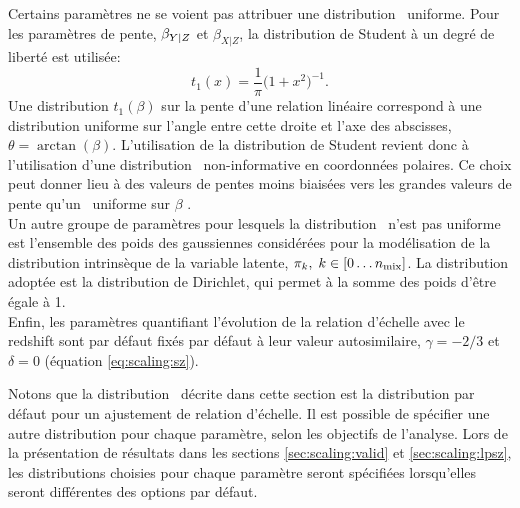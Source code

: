 Certains paramètres ne se voient pas attribuer une distribution \prior\ uniforme.
Pour les paramètres de pente, $\beta_{Y|Z}$ et $\beta_{X|Z}$, la distribution de Student à un degré de liberté est utilisée:
\begin{equation}
    t_1(x) = \frac{1}{\pi} \big(1 + x^2\big)^{-1}.
\end{equation}
Une distribution $t_1(\beta)$ sur la pente d'une relation linéaire correspond à une distribution uniforme sur l'angle entre cette droite et l'axe des abscisses, $\theta = \arctan(\beta)$.
L'utilisation de la distribution de Student revient donc à l'utilisation d'une distribution \prior\ non-informative en coordonnées polaires.
Ce choix peut donner lieu à des valeurs de pentes moins biaisées vers les grandes valeurs de pente qu'un \prior\ uniforme sur $\beta$ \cite{andreon_measurement_2013,sereno_bayesian_2016}. \\
Un autre groupe de paramètres pour lesquels la distribution \prior\ n'est pas uniforme est l'ensemble des poids des gaussiennes considérées pour la modélisation de la distribution intrinsèque de la variable latente, $\pi_k,\; k \in [0\dots n_{\rm mix}]$.
La distribution adoptée est la distribution de Dirichlet, qui permet à la somme des poids d'être égale à 1. \\
Enfin, les paramètres quantifiant l'évolution de la relation d'échelle avec le redshift sont par défaut fixés par défaut à leur valeur autosimilaire, $\gamma=-2/3$ et $\delta=0$ (équation \ref{eq:scaling:sz}).

Notons que la distribution \prior\ décrite dans cette section est la distribution par défaut pour un ajustement de relation d'échelle.
Il est possible de spécifier une autre distribution pour chaque paramètre, selon les objectifs de l'analyse.
Lors de la présentation de résultats dans les sections \ref{sec:scaling:valid} et \ref{sec:scaling:lpsz}, les distributions choisies pour chaque paramètre seront spécifiées lorsqu'elles seront différentes des options par défaut.

